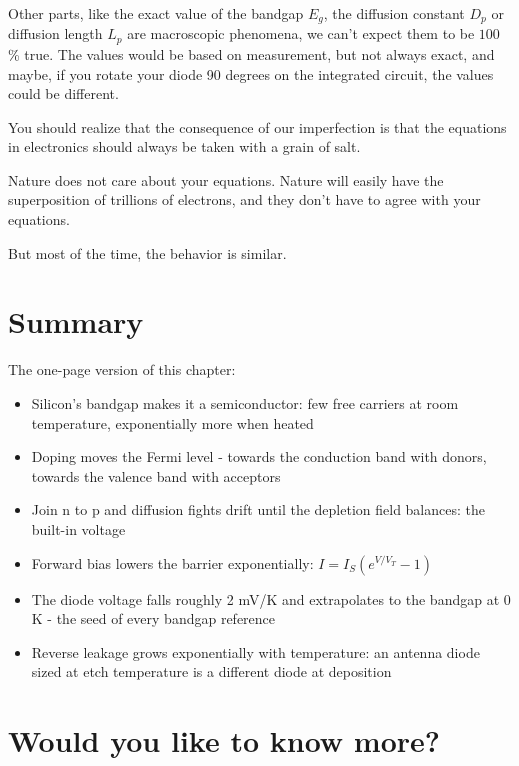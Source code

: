 Other parts, like the exact value of the bandgap \(E_g\), the diffusion
constant \(D_p\) or diffusion length \(L_p\) are macroscopic phenomena,
we can't expect them to be \(100\) \% true. The values would be based on
measurement, but not always exact, and maybe, if you rotate your diode
90 degrees on the integrated circuit, the values could be different.

You should realize that the consequence of our imperfection is that the
equations in electronics should always be taken with a grain of salt.

Nature does not care about your equations. Nature will easily have the
superposition of trillions of electrons, and they don't have to agree
with your equations.

But most of the time, the behavior is similar.

\section{Summary}\label{summary}

The one-page version of this chapter:

\begin{itemize}
\tightlist
\item
  Silicon's bandgap makes it a semiconductor: few free carriers at room
  temperature, exponentially more when heated
\item
  Doping moves the Fermi level - towards the conduction band with
  donors, towards the valence band with acceptors
\item
  Join n to p and diffusion fights drift until the depletion field
  balances: the built-in voltage
\item
  Forward bias lowers the barrier exponentially:
  \(I = I_S(e^{V/V_T} - 1)\)
\item
  The diode voltage falls roughly 2 mV/K and extrapolates to the bandgap
  at 0 K - the seed of every bandgap reference
\item
  Reverse leakage grows exponentially with temperature: an antenna diode
  sized at etch temperature is a different diode at deposition
\end{itemize}

\section*{Would you like to know
more?}\label{would-you-like-to-know-more}

